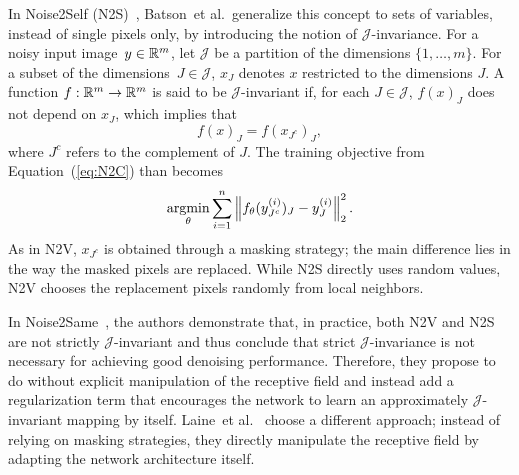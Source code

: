 In Noise2Self (N2S)~\cite{N2S}, Batson~et al.\ generalize this concept to sets of variables, instead of single pixels only, by introducing the notion of $\mathcal{J}$-invariance.
For a noisy input image~$y \in \mathbb{R}^m$, let $\mathcal{J}$ be a partition of the dimensions $\{1,\dots,m\}$.
For a subset of the dimensions~$J \in \mathcal{J}$, $x_J$ denotes $x$ restricted to the dimensions $J$.
A function $f: \mathbb{R}^m \rightarrow \mathbb{R}^m$ is said to be $\mathcal{J}$-invariant if, for each $J \in \mathcal{J}$, $f(x)_J$ does not depend on $x_J$, which implies that
\begin{equation}
    f(x)_J = f(x_{J^c})_J,
\end{equation}
where $J^c$ refers to the complement of $J$.
The training objective from Equation~(\ref{eq:N2C}) than becomes
\begin{equation}
    \operatorname*{argmin}_\theta \sum_{i=1}^{n} \left\lVert f_\theta(y^{(i)}_{J^c})_J - y^{(i)}_J\right\rVert_2^2.
\end{equation}
As in N2V, $x_{J^c}$ is obtained through a masking strategy; the main difference lies in the way the masked pixels are replaced.
While N2S directly uses random values, N2V chooses the replacement pixels randomly from local neighbors.

In Noise2Same~\cite{Noise2Same}, the authors demonstrate that, in practice, both N2V and N2S are not strictly $\mathcal{J}$-invariant and thus conclude that strict $\mathcal{J}$-invariance is not necessary for achieving good denoising performance.
Therefore, they propose to do without explicit manipulation of the receptive field and instead add a regularization term that encourages the network to learn an approximately $\mathcal{J}$-invariant mapping by itself.
Laine~et al.~\cite{BSN} choose a different approach; instead of relying on masking strategies, they directly manipulate the receptive field by adapting the network architecture itself.
